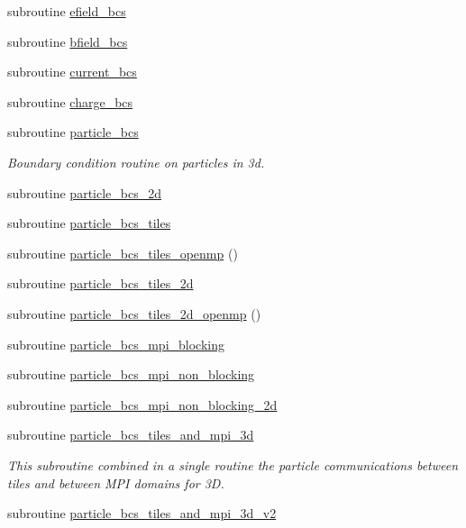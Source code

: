 \begin{DoxyCompactItemize}
\item 
subroutine \hyperlink{namespaceboundary_a2397a80ea9511ae3266ad16c668cc547}{efield\+\_\+bcs}
\item 
subroutine \hyperlink{namespaceboundary_af2316f12b3b85debc7214c4c47035322}{bfield\+\_\+bcs}
\item 
subroutine \hyperlink{namespaceboundary_a2bd382bbf256b1208d4fd3721c37ad08}{current\+\_\+bcs}
\item 
subroutine \hyperlink{namespaceboundary_a0b6d77029b51dd2a0e853c265885ab6c}{charge\+\_\+bcs}
\item 
subroutine \hyperlink{namespaceboundary_a9e7ba00d025d595683607b3ccd95bcb3}{particle\+\_\+bcs}
\begin{DoxyCompactList}\small\item\em Boundary condition routine on particles in 3d. \end{DoxyCompactList}\item 
subroutine \hyperlink{namespaceboundary_aad89819169dca0b0ae8cf04748a86fb1}{particle\+\_\+bcs\+\_\+2d}
\item 
subroutine \hyperlink{namespaceboundary_added6cf2ea0ffc7ab618c3d9af16fade}{particle\+\_\+bcs\+\_\+tiles}
\item 
subroutine \hyperlink{namespaceboundary_af6d7a140eef6818609e44869b67cd3a7}{particle\+\_\+bcs\+\_\+tiles\+\_\+openmp} ()
\item 
subroutine \hyperlink{namespaceboundary_afb4e6ab09e288dab2bb9ce2d731e276f}{particle\+\_\+bcs\+\_\+tiles\+\_\+2d}
\item 
subroutine \hyperlink{namespaceboundary_a9f9517df19ef503bb2a69e63aeec91d4}{particle\+\_\+bcs\+\_\+tiles\+\_\+2d\+\_\+openmp} ()
\item 
subroutine \hyperlink{namespaceboundary_a1789d63402ac897697791a2fca4fa8e6}{particle\+\_\+bcs\+\_\+mpi\+\_\+blocking}
\item 
subroutine \hyperlink{namespaceboundary_aac32f7f65f1998963706f9d5776d29d2}{particle\+\_\+bcs\+\_\+mpi\+\_\+non\+\_\+blocking}
\item 
subroutine \hyperlink{namespaceboundary_a3293856926030dfea9e8ca05c61e1a5a}{particle\+\_\+bcs\+\_\+mpi\+\_\+non\+\_\+blocking\+\_\+2d}
\item 
subroutine \hyperlink{namespaceboundary_ac117306978e83b787afba90c3ac038f4}{particle\+\_\+bcs\+\_\+tiles\+\_\+and\+\_\+mpi\+\_\+3d}
\begin{DoxyCompactList}\small\item\em This subroutine combined in a single routine the particle communications between tiles and between M\+PI domains for 3D. \end{DoxyCompactList}\item 
subroutine \hyperlink{namespaceboundary_ac57434911e0d575eb459fbadcb8f9ef2}{particle\+\_\+bcs\+\_\+tiles\+\_\+and\+\_\+mpi\+\_\+3d\+\_\+v2}
\end{DoxyCompactItemize}


